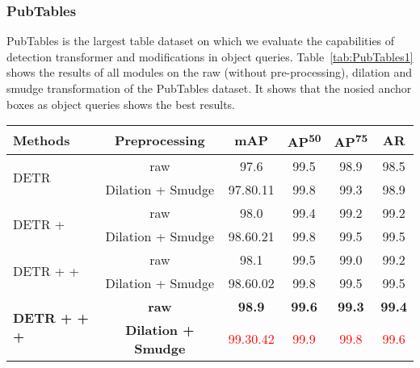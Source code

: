 \documentclass[sn-mathphys]{sn-jnl}\jyear{2021}\theoremstyle{thmstyleone}\newtheorem{theorem}{Theorem}\newtheorem{proposition}[theorem]{Proposition}\theoremstyle{thmstyletwo}\newtheorem{example}{Example}\newtheorem{remark}{Remark}\theoremstyle{thmstylethree}\newtheorem{definition}{Definition}\usepackage{amsmath}
\begin{document}
\subsubsection{PubTables}
\label{sec:PubTables-result}
PubTables is the largest table dataset on which we evaluate the capabilities of detection transformer and modifications in object queries. Table~\ref{tab:PubTables1} shows the results of all modules on the raw (without pre-processing), dilation and smudge transformation of the PubTables dataset. It shows that the nosied anchor boxes as object queries shows the best results.

\begin{table*}[h!]
\tiny
\begin{center}
\caption{Comparison between transformer-based detector results on  raw (without pre-processing), dilation and smudge transformation of the PubTables dataset. Here, term  represents object queries as anchor boxes,  denotes object queries with positive noise and  indicates object queries with negative noise. The IoU thresholds are set to 0.5 and 0.75 for average precision and also calculate average recall for large objects. The best results are highlighted. }\label{tab:PubTables1}
\begin{tabular*}{\textwidth}{@{\extracolsep{\fill}}lccccc@{\extracolsep{\fill}}}
\toprule
\textbf{Methods} & 
\textbf{Preprocessing } &
\textbf{mAP} & 
\textbf{AP\textsuperscript{50}} &
\textbf{AP\textsuperscript{75}} &
\textbf{AR} \\
\midrule
\multirow{2}{*}{DETR} & raw & 97.6& 99.5 & 98.9  & 98.5\\
& Dilation + Smudge & 97.80.11 & 99.8 & 99.3 & 98.9\\

\midrule
 \multirow{2}{*}{DETR +  }& raw & 98.0 & 99.4 & 99.2 & 99.2\\
& Dilation + Smudge & 98.60.21 & 99.8& 99.5 & 99.5\\
\midrule

\multirow{2}{*}{DETR +  + } & raw & 98.1 & 99.5 & 99.0 & 99.2\\
& Dilation + Smudge & 98.60.02 & 99.8 & 99.5 & 99.5\\
\midrule
\multirow{2}{*}{\textbf{DETR +  +  + }}& \textbf{raw} & \textbf{98.9} & \textbf{99.6} & \textbf{99.3} & \textbf{99.4}\\
& \textbf{Dilation + Smudge} & \textcolor{red}{99.30.42} & \textcolor{red}{99.9} & \textcolor{red}{99.8} & \textcolor{red}{99.6}\\
\bottomrule
\end{tabular*}
\end{center}
\end{table*} 
\end{document}
